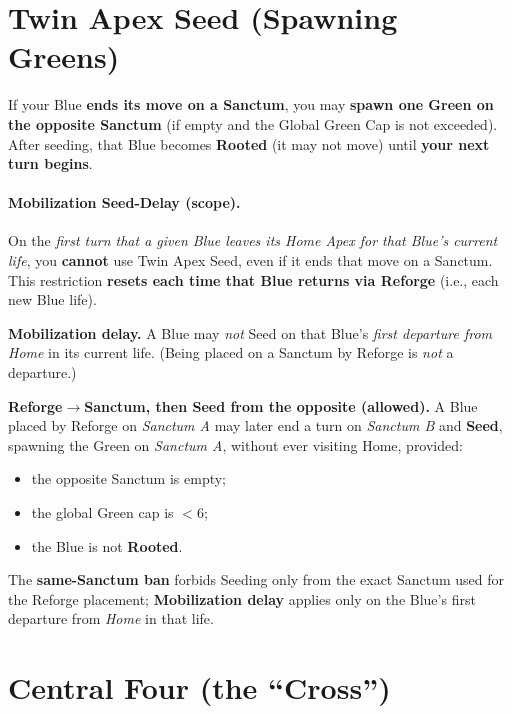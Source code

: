 \documentclass[11pt]{article}
\begin{document}
\section{Twin Apex Seed (Spawning Greens)}
\label{sec:twinapex}
If your Blue \textbf{ends its move on a Sanctum}, you may \textbf{spawn one Green on the opposite Sanctum} (if empty and the Global Green Cap is not exceeded). After seeding, that Blue becomes \textbf{Rooted} (it may not move) until \textbf{your next turn begins}.\\[2pt]
\paragraph{Mobilization Seed-Delay (scope).}
On the \emph{first turn that a given Blue leaves its Home Apex for that Blue's current life}, you \textbf{cannot} use Twin Apex Seed, even if it ends that move on a Sanctum. 
This restriction \textbf{resets each time that Blue returns via Reforge} (i.e., each new Blue life).

\begin{tcolorbox}[enhanced,breakable,title={Rules Note --- Mobilization Delay \& Reforge$\rightarrow$Sanctum Seeding},
  colback=white,colframe=royal,boxrule=0.8pt]
\small
\textbf{Mobilization delay.} A Blue may \emph{not} Seed on that Blue's \emph{first departure from Home} in its current life.
(Being placed on a Sanctum by Reforge is \emph{not} a departure.)

\medskip
\textbf{Reforge$\rightarrow$Sanctum, then Seed from the opposite (allowed).} A Blue placed by Reforge on \emph{Sanctum A}
may later end a turn on \emph{Sanctum B} and \textbf{Seed}, spawning the Green on \emph{Sanctum A}, without ever
visiting Home, provided:
\begin{itemize}[leftmargin=1.1em,itemsep=0.2em]
  \item the opposite Sanctum is empty;
  \item the global Green cap is $<6$;
  \item the Blue is not \textbf{Rooted}.
\end{itemize}
The \textbf{same-Sanctum ban} forbids Seeding only from the exact Sanctum used for the Reforge placement;
\textbf{Mobilization delay} applies only on the Blue's first departure from \emph{Home} in that life.
\end{tcolorbox}


\section{Central Four (the ``Cross'')}
\label{sec:bluecross}
\end{document}
